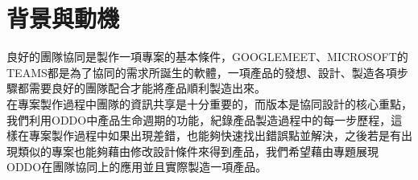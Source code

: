 \chapter{背景與動機}


\fontsize{14pt}{2.5pt}\sectionef 
良好的團隊協同是製作一項專案的基本條件，GOOGLEMEET、MICROSOFT的TEAMS都是為了協同的需求所誕生的軟體，一項產品的發想、設計、製造各項步驟都需要良好的團隊配合才能將產品順利製造出來。\\[14pt]

\fontsize{14pt}{2.5pt}\sectionef\hspace{12pt} 在專案製作過程中團隊的資訊共享是十分重要的，而版本是協同設計的核心重點，我們利用ODDO中產品生命週期的功能，紀錄產品製造過程中的每一步歷程，這樣在專案製作過程中如果出現差錯，也能夠快速找出錯誤點並解決，之後若是有出現類似的專案也能夠藉由修改設計條件來得到產品，我們希望藉由專題展現ODDO在團隊協同上的應用並且實際製造一項產品。\\[12pt]
